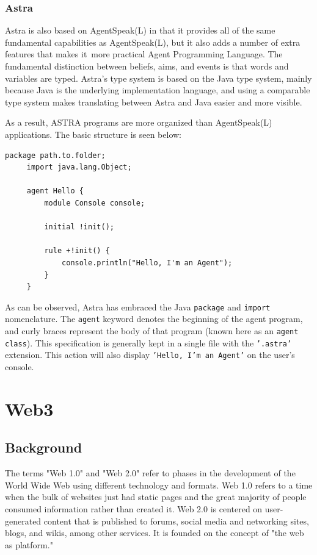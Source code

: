 \subsubsection{Astra}

Astra is also based on AgentSpeak(L) in that it provides all of the same fundamental capabilities as AgentSpeak(L), but it also adds a number of extra features that makes it more practical Agent Programming Language. The fundamental distinction between beliefs, aims, and events is that words and variables are typed. Astra's type system is based on the Java type system, mainly because Java is the underlying implementation language, and using a comparable type system makes translating between Astra and Java easier and more visible.

\vspace{.5cm}
As a result, ASTRA programs are more organized than AgentSpeak(L) applications. The basic structure is seen below:

\vspace{.5cm}

\begin{lstlisting}[backgroundcolor = \color{white}, frame=none, numbers=none]
     package path.to.folder;
     import java.lang.Object;
     
     agent Hello {
         module Console console;
    
         initial !init();
    
         rule +!init() {
             console.println("Hello, I'm an Agent");
         }
     }
\end{lstlisting}

\vspace{.5cm}

As can be observed, Astra has embraced the Java \texttt{package} and \texttt{import} nomenclature. The \texttt{agent} keyword denotes the beginning of the agent program, and curly braces represent the body of that program (known here as an \texttt{agent class}). This specification is generally kept in a single file with the \texttt{'.astra'} extension. This action will also display \texttt{'Hello, I'm an Agent'} on the user's console.

\section{Web3}

\subsection{Background}
The terms "Web 1.0" and "Web 2.0" refer to phases in the development of the World Wide Web using different technology and formats. Web 1.0 refers to a time when the bulk of websites just had static pages and the great majority of people consumed information rather than created it. Web 2.0 is centered on user-generated content that is published to forums, social media and networking sites, blogs, and wikis, among other services. It is founded on the concept of "the web as platform."

